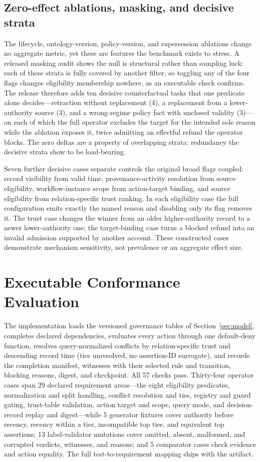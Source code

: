 \documentclass[conference]{IEEEtran}
\begin{document}
\subsection{Zero-effect ablations, masking, and decisive strata}
\label{sec:decisive}
The lifecycle, ontology-version, policy-version, and supersession ablations change no aggregate metric, yet these are features the benchmark exists to stress. A released masking audit shows the null is structural rather than sampling luck: each of these strata is fully covered by another filter, so toggling any of the four flags changes eligibility membership nowhere, as an executable check confirms. The release therefore adds ten decisive counterfactual tasks that one predicate alone decides---retraction without replacement (4), a replacement from a lower-authority source (3), and a wrong-regime policy fact with unclosed validity (3)---on each of which the full operator excludes the target for the intended sole reason while the ablation exposes it, twice admitting an effectful refund the operator blocks. The zero deltas are a property of overlapping strata: redundancy the decisive strata show to be load-bearing.

Seven further decisive cases separate controls the original broad flags coupled: record visibility from valid time, provenance-activity resolution from source eligibility, workflow-instance scope from action-target binding, and source eligibility from relation-specific trust ranking. In each eligibility case the full configuration emits exactly the named reason and disabling only its flag removes it. The trust case changes the winner from an older higher-authority record to a newer lower-authority one; the target-binding case turns a blocked refund into an invalid admission supported by another account. These constructed cases demonstrate mechanism sensitivity, not prevalence or an aggregate effect size.


\section{Executable Conformance Evaluation}
\label{sec:audit}
The implementation loads the versioned governance tables of Section~\ref{sec:model}, completes declared dependencies, evaluates every action through one default-deny function, resolves query-normalized conflicts by relation-specific trust and descending record time (ties unresolved, no assertion-ID surrogate), and records the completion manifest, witnesses with their selected rule and transition, blocking reasons, digest, and checkpoint. All 57 checks pass. Thirty-four operator cases span 29 declared requirement areas---the eight eligibility predicates, normalization and split handling, conflict resolution and ties, registry and guard gating, trust-table validation, action target and scope, query mode, and decision-record replay and digest---while 5 generator fixtures cover authority before recency, recency within a tier, incompatible top ties, and equivalent top assertions; 13 label-validator mutations cover omitted, absent, malformed, and corrupted verdicts, witnesses, and reasons; and 5 comparator cases check evidence and action equality. The full test-to-requirement mapping ships with the artifact.
\end{document}
